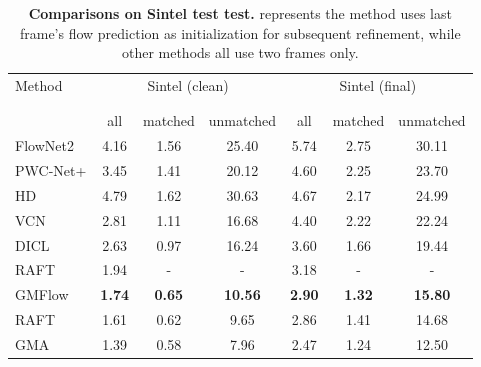 \documentclass[10pt,twocolumn,letterpaper]{article}
\begin{document}
\begin{table}[t]
\footnotesize
    \centering
    \setlength{\tabcolsep}{2pt} \begin{tabular}{lcccccc}
    \toprule
    \multirow{2}{*}[-2pt]{Method } & \multicolumn{3}{c}{Sintel (clean)} &
    \multicolumn{3}{c}{Sintel (final)} \\
    \addlinespace[-12pt]  \\
    \cmidrule(lr){2-4} \cmidrule(lr){5-7} 
    \addlinespace[-12pt] \\
    & all & matched & unmatched & all & matched & unmatched \\
    \midrule
    
    FlowNet2 \cite{ilg2017flownet} & 4.16 & 1.56 & 25.40 & 5.74 & 2.75 & 30.11 \\
    PWC-Net+ \cite{sun2019models} & 3.45 & 1.41 & 20.12 & 4.60 & 2.25 & 23.70  \\
    HD \cite{yin2019hierarchical} & 4.79 & 1.62 & 30.63 & 4.67 & 2.17 & 24.99 \\
    VCN \cite{yang2019volumetric} & 2.81 & 1.11 & 16.68 & 4.40 & 2.22 & 22.24 \\
    DICL \cite{wang2020displacement} & 2.63 & 0.97 & 16.24 & 3.60 & 1.66 & 19.44 \\
    
    RAFT \cite{teed2020raft} & 1.94 & - & - & 3.18 & - & - \\
    GMFlow & \textbf{1.74} & \textbf{0.65} & \textbf{10.56} & \textbf{2.90} & \textbf{1.32} & \textbf{15.80} \\
    
    \midrule
    
    RAFT \cite{teed2020raft} & 1.61 & 0.62 & 9.65 & 2.86 & 1.41 & 14.68 \\
    GMA \cite{Jiang_2021_ICCV} & 1.39 & 0.58 & 7.96 & 2.47 & 1.24 & 12.50 \\
    

    \bottomrule
    \end{tabular}
    \vspace{-8pt}
    \caption{\textbf{Comparisons on Sintel test test.}  represents the method uses last frame's flow prediction as initialization for subsequent refinement, while other methods all use two frames only.}
    \vspace{-16pt}
    \label{tab:sintel_compare}
\end{table}
\end{document}

